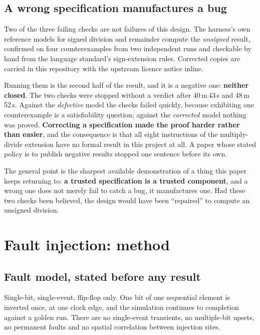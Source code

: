 \documentclass[11pt,a4paper]{article}
\begin{document}
\subsection{A wrong specification manufactures a bug}

Two of the three failing checks are not failures of this design. The
harness's own reference models for signed division and remainder compute
the \emph{unsigned} result, confirmed on four counterexamples from two
independent runs and checkable by hand from the language standard's
sign-extension rules. Corrected copies are carried in this repository
with the upstream licence notice inline.

Running them is the second half of the result, and it is a negative one:
\textbf{neither closed}. The two checks were stopped without a verdict
after 40\,m\,43\,s and 48\,m\,52\,s. Against the \emph{defective} model
the checks failed quickly, because exhibiting one counterexample is a
satisfiability question; against the \emph{corrected} model nothing was
proved. \textbf{Correcting a specification made the proof harder rather
than easier}, and the consequence is that all eight instructions of the
multiply-divide extension have no formal result in this project at all.
A paper whose stated policy is to publish negative results stopped one
sentence before its own.

The general point is the sharpest available demonstration of a thing this
paper keeps returning to: \textbf{a trusted specification is a trusted
component}, and a wrong one does not merely fail to catch a bug, it
manufactures one. Had these two checks been believed, the design would
have been ``repaired'' to compute an unsigned division.

\section{Fault injection: method}
\label{sec:fi-method}

\subsection{Fault model, stated before any result}

Single-bit, single-event, flip-flop only. One bit of one sequential
element is inverted once, at one clock edge, and the simulation continues
to completion against a golden run. There are no single-event transients,
no multiple-bit upsets, no permanent faults and no spatial correlation
between injection sites.
\end{document}
